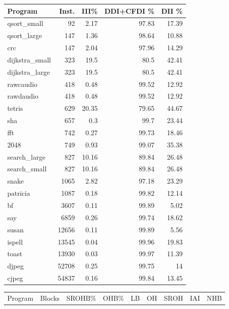 \begin{tabular}{lrrrr}
\hline
 Program        &   Inst. &   III\% &   DDI+CFDI \% &   DII \% \\
\hline
 qsort\_small    &      92 &   2.17 &        97.83 &   17.39 \\
 qsort\_large    &     147 &   1.36 &        98.64 &   10.88 \\
 crc            &     147 &   2.04 &        97.96 &   14.29 \\
 dijkstra\_small &     323 &  19.5  &        80.5  &   42.41 \\
 dijkstra\_large &     323 &  19.5  &        80.5  &   42.41 \\
 rawcaudio      &     418 &   0.48 &        99.52 &   12.92 \\
 rawdaudio      &     418 &   0.48 &        99.52 &   12.92 \\
 tetris         &     629 &  20.35 &        79.65 &   44.67 \\
 sha            &     657 &   0.3  &        99.7  &   23.44 \\
 fft            &     742 &   0.27 &        99.73 &   18.46 \\
 2048           &     749 &   0.93 &        99.07 &   35.38 \\
 search\_large   &     827 &  10.16 &        89.84 &   26.48 \\
 search\_small   &     827 &  10.16 &        89.84 &   26.48 \\
 snake          &    1065 &   2.82 &        97.18 &   23.29 \\
 patricia       &    1087 &   0.18 &        99.82 &   12.14 \\
 bf             &    3607 &   0.11 &        99.89 &    5.02 \\
 say            &    6859 &   0.26 &        99.74 &   18.62 \\
 susan          &   12656 &   0.11 &        99.89 &    5.56 \\
 ispell         &   13545 &   0.04 &        99.96 &   19.83 \\
 toast          &   13930 &   0.03 &        99.97 &   11.39 \\
 djpeg          &   52708 &   0.25 &        99.75 &   14    \\
 cjpeg          &   54837 &   0.16 &        99.84 &   13.45 \\
\hline
\end{tabular}\begin{tabular}{lrrrrrrrr}
\hline
 Program        &   Blocks &   SROHB\% &   OHB\% &   LB &   OH &   SROH &   IAI &   NHB \\

\end{tabular}
